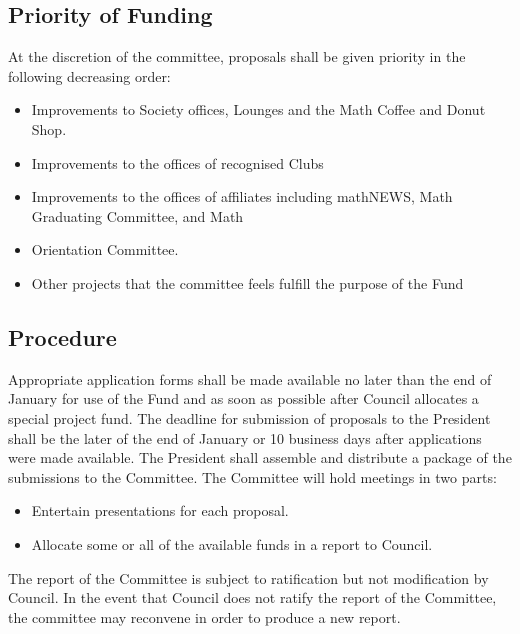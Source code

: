 \subsection{Priority of Funding}
At the discretion of the committee, proposals shall be given priority in the following decreasing order:\
\begin{itemize}
\item Improvements to Society offices, Lounges and the Math Coffee and Donut Shop.
\item Improvements to the offices of recognised Clubs
\item Improvements to the offices of affiliates including mathNEWS, Math Graduating Committee, and Math \item Orientation Committee.
\item Other projects that the committee feels fulfill the purpose of the Fund
\end{itemize}


\subsection{Procedure}
Appropriate application forms shall be made available no later than the end of January for use of the Fund and as soon as possible after Council allocates a special project fund. The deadline for submission of proposals to the President shall be the later of the end of January or 10 business days after applications were made available.
The President shall assemble and distribute a package of the submissions to the Committee.
The Committee will hold meetings in two parts:
\begin{itemize}
\item Entertain presentations for each proposal.
\item Allocate some or all of the available funds in a report to Council.
\end{itemize}
The report of the Committee is subject to ratification but not modification by Council. In the event that Council does not ratify the report of the Committee, the committee may reconvene in order to produce a new report.
